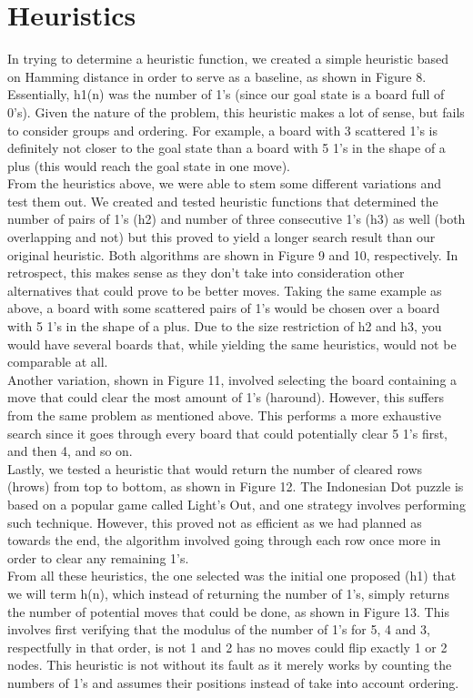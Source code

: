 \section{Heuristics}

In trying to determine a heuristic function, we created a simple heuristic based on Hamming distance in order to serve as a baseline, as shown in Figure 8. Essentially, h1(n) was the number of 1’s (since our goal state is a board full of 0’s). Given the nature of the problem, this heuristic makes a lot of sense, but fails to consider groups and ordering. For example, a board with 3 scattered 1’s is definitely not closer to the goal state than a board with 5 1’s in the shape of a plus (this would reach the goal state in one move).
\\

From the heuristics above, we were able to stem some different variations and test them out. We created and tested heuristic functions that determined the number of pairs of 1's (h2) and number of three consecutive 1's (h3) as well (both overlapping and not) but this proved to yield a longer search result than our original heuristic. Both algorithms are shown in Figure 9 and 10, respectively. In retrospect, this makes sense as they don’t take into consideration other alternatives that could prove to be better moves. Taking the same example as above, a board with some scattered pairs of 1’s would be chosen over a board with 5 1’s in the shape of a plus. Due to the size restriction of h2 and h3, you would have several boards that, while yielding the same heuristics, would not be comparable at all.
\\

Another variation, shown in Figure 11, involved selecting the board containing a move that could clear the most amount of 1’s (haround). However, this suffers from the same problem as mentioned above. This performs a more exhaustive search since it goes through every board that could potentially clear 5 1’s first, and then 4, and so on. 
\\

Lastly, we tested a heuristic that would return the number of cleared rows (hrows) from top to bottom, as shown in Figure 12. The Indonesian Dot puzzle is based on a popular game called Light’s Out, and one strategy involves performing such technique. However, this proved not as efficient as we had planned as towards the end, the algorithm involved going through each row once more in order to clear any remaining 1’s. 
\\

From all these heuristics, the one selected was the initial one proposed (h1) that we will term h(n), which instead of returning the number of 1’s, simply returns the number of potential moves that could be done, as shown in Figure 13. This involves first verifying that the modulus of the number of 1’s for 5, 4 and 3, respectfully in that order, is not 1 and 2 has no moves could flip exactly 1 or 2 nodes. This heuristic is not without its fault as it merely works by counting the numbers of 1’s and assumes their positions instead of take into account ordering.
